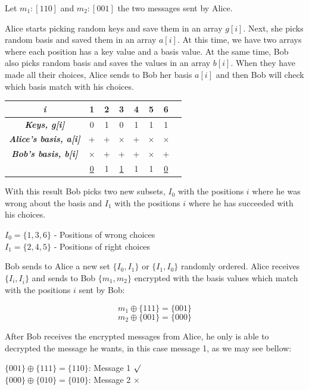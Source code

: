 Let $m_{1}: [1 1 0]$ and $m_{2}:[0 0 1]$ the two messages sent by Alice.

Alice starts picking random keys and save them in an array $g[i]$. Next, she picks random basis and saved them in an array $a[i]$. At this time, we have two arrays where each position has a key value and a basis value.
At the same time, Bob also picks random basis and saves the values in an array $b[i]$.
When they have made all their choices, Alice sends to Bob her basis $a[i]$ and then Bob will check which basis match with his choices.

\begin{table}[H]
\centering
\begin{tabular}{c|c|c|c|c|c|c|c}
\textbf{\textit{i}}         & 1 & 2 & 3 & 4 & 5 & 6      \\ \hline
\textbf{\textit{Keys, g[i]}}  & 0 & 1 & 0 & 1 & 1 & 1     \\ \hline
\textbf{\textit{Alice's basis, a[i]}} & + & + & $\times$ &+ & $\times$ & $\times$ \\ \hline
\textbf{\textit{Bob's basis, b[i]}} & $\times$ & + & + &+ & $\times$ & + \\ \hline

		 & \underline{0} & 1 & \underline{1} & 1 & 1 & \underline{0} \\ \hline
\end{tabular}
\end{table}

With this result Bob picks two new subsets, $I_{0}$ with the positions $i$ where he was wrong about the basis and $I_{1}$ with the positions $i$ where he has succeeded with his choices.

\begin{center}
$I_{0} = \{ 1,3,6 \}$ - Positions of wrong choices\\
$I_{1} = \{ 2,4,5 \}$ - Positions of right choices
\end{center}

Bob sends to Alice a new set $ \{ I_{0},I_{1} \}$ or $\{ I_{1}, I_{0}\}$ randomly ordered. Alice receives $\{ I_{i}, I_{\bar{i}}\}$ and sends to Bob $\{ m_{1}, m_{2}\}$ encrypted with the basis values which match with the positions $i$ sent by Bob:

$$m_{1} \oplus{} \{ 1 1 1 \} = \{ 0 0 1\}$$
$$m_{2} \oplus{} \{ 0 0 1 \} = \{ 0 0 0\}$$

After Bob receives the encrypted messages from Alice, he only is able to decrypted the message he wants, in this case message 1, as we may see bellow:
\begin{center}
$\{ 0 0 1\} \oplus{} \{ 1 1 1\} = \{ 1 1 0\} $: Message 1 $\surd$ \\
$\{ 0 0 0\} \oplus{} \{ 0 1 0\} = \{ 0 1 0\} $: Message 2 $\times$ \\
\end{center}

